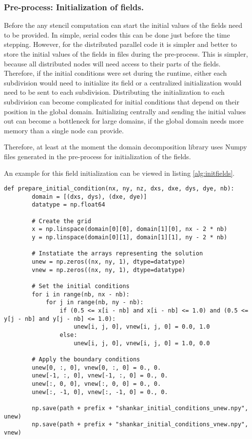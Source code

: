 \subsubsection{Pre-process: Initialization of fields.}
Before the any stencil computation can start the initial values of the fields need to be provided.
In simple, serial codes this can be done just before the time stepping.
However, for the distributed parallel code it is simpler and better to store the initial values of the fields in files during the pre-process.
This is simpler, because all distributed nodes will need access to their parts of the fields.
Therefore, if the initial conditions were set during the runtime, either each subdivision would need to initialize its field or a centralized initialization would need to be sent to each subdivision.
Distributing the initialization to each subdivision can become complicated for initial conditions that depend on their position in the global domain.
Initializing centrally and sending the initial values out can become a bottleneck for large domains, if the global domain needs more memory than a single node can provide.

Therefore, at least at the moment the domain decomposition library uses Numpy files generated in the pre-process for initialization of the fields.

An example for this field initialization can be viewed in listing \ref{alg:initfields}.

\begin{lstlisting}[caption={Example code of the domain pre-process function to initialize to fields "unew" and "vnew"},captionpos=b, label={alg:initfields}, float, floatplacement=H]
def prepare_initial_condition(nx, ny, nz, dxs, dxe, dys, dye, nb):
        domain = [(dxs, dys), (dxe, dye)]
        datatype = np.float64

        # Create the grid
        x = np.linspace(domain[0][0], domain[1][0], nx - 2 * nb)
        y = np.linspace(domain[0][1], domain[1][1], ny - 2 * nb)

        # Instatiate the arrays representing the solution
        unew = np.zeros((nx, ny, 1), dtype=datatype)
        vnew = np.zeros((nx, ny, 1), dtype=datatype)

        # Set the initial conditions
        for i in range(nb, nx - nb):
            for j in range(nb, ny - nb):
                if (0.5 <= x[i - nb] and x[i - nb] <= 1.0) and (0.5 <= y[j - nb] and y[j - nb] <= 1.0):
                    unew[i, j, 0], vnew[i, j, 0] = 0.0, 1.0
                else:
                    unew[i, j, 0], vnew[i, j, 0] = 1.0, 0.0

        # Apply the boundary conditions
        unew[0, :, 0], vnew[0, :, 0] = 0., 0.
        unew[-1, :, 0], vnew[-1, :, 0] = 0., 0.
        unew[:, 0, 0], vnew[:, 0, 0] = 0., 0.
        unew[:, -1, 0], vnew[:, -1, 0] = 0., 0.

        np.save(path + prefix + "shankar_initial_conditions_unew.npy", unew)
        np.save(path + prefix + "shankar_initial_conditions_vnew.npy", vnew)
\end{lstlisting}

